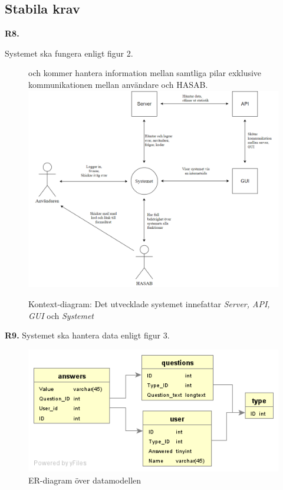 \documentclass{article}
\begin{document}
    \subsection{Stabila krav}
    \noindent \large{\textbf{R8.}}
    \normalsize{Systemet ska fungera enligt figur 2.
    
    \begin{figure}[h!]
    \caption{Kontext-diagram: Det utvecklade systemet innefattar \textit{Server, API, GUI} och \textit{Systemet}} och kommer hantera information mellan samtliga pilar exklusive kommunikationen mellan användare och HASAB.
    \includegraphics[width=150mm]{Kontextdiagram.png}
    
    \end{figure}
}
    \newpage
    \noindent \large{\textbf{R9.}}
    Systemet ska hantera data enligt figur 3.
       \begin{figure}[h!]
    
    \includegraphics[width=150mm]{er.png}
    \caption{ER-diagram över datamodellen}
    \end{figure}
    
\end{document}
